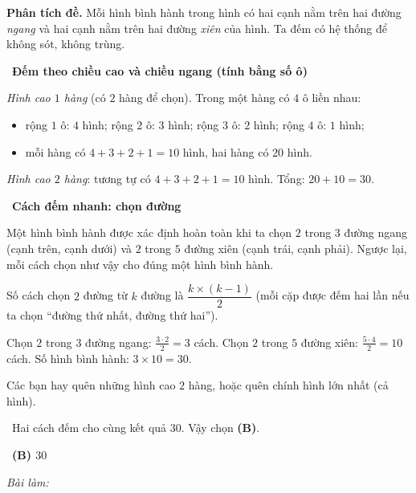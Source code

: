 \documentclass[11pt]{article}
\newif\ifsol \solfalse
\providecommand{\AnsWord}{Đáp số}
\newcommand{\StuProb}[2]{\begin{probboxS}{#1}{#2}\StuProbBody\end{probboxS}}
\newcommand{\ans}[1]{\par\smallskip{\bfseries\color{tmGreen!88!black}\AnsWord:}\ {\bfseries\color{AnsRed}#1}\par}
\newcommand{\probsol}[1]{%
  \begin{lrbox}{\solmeasure}\begin{minipage}{\dimexpr\linewidth-24pt\relax}#1\end{minipage}\end{lrbox}%
  \ifsol
    \begin{solbox}#1\end{solbox}%
  \else
    \setlength{\solht}{\dimexpr\ht\solmeasure+\dp\solmeasure+0.85cm\relax}%
    \ifdim\solht<1.35cm\setlength{\solht}{1.35cm}\fi
    \ifdim\solht>\StudentMaxWork\setlength{\solht}{\StudentMaxWork}\fi
    \par\noindent\begin{minipage}{\linewidth}%
    \expandafter\StuProb\StuProbArgs
    \begin{tcolorbox}[colback=white,colframe=Line,boxrule=0.8pt,arc=5pt,
      left=8pt,right=8pt,top=4pt,bottom=4pt,height=\solht]{\footnotesize\color{Slate}\itshape\WorkWord}\end{tcolorbox}%
    \end{minipage}\par\medskip
  \fi}
\newlength{\StudentMaxWork}\setlength{\StudentMaxWork}{4.5cm}
\newcommand{\step}[2]{\par\smallskip\noindent{\bfseries\color{tmBlue!85!black}\StepWord~#1.}\ {\bfseries #2}\par\nopagebreak}
\newcommand{\verify}[1]{\par\smallskip\noindent{\bfseries\color{tmGreen!80!black}\faCheckCircle\ \CheckWord}\ #1\par}
\def\WorkWord{Bài làm:}
\def\AnsWord{Đáp số}
\def\StepWord{Bước}
\def\CheckWord{Thử lại:}
\begin{document}
\probsol{
\textbf{Phân tích đề.} Mỗi hình bình hành trong hình có hai cạnh nằm trên hai đường \emph{ngang} và hai cạnh
nằm trên hai đường \emph{xiên} của hình. Ta đếm có hệ thống để không sót, không trùng.

\step{1}{Đếm theo chiều cao và chiều ngang (tính bằng số ô)}
\emph{Hình cao $1$ hàng} (có $2$ hàng để chọn). Trong một hàng có $4$ ô liền nhau:
\begin{itemize}[leftmargin=1.4em,itemsep=1pt]
\item rộng $1$ ô: $4$ hình; rộng $2$ ô: $3$ hình; rộng $3$ ô: $2$ hình; rộng $4$ ô: $1$ hình;
\item mỗi hàng có $4+3+2+1=10$ hình, hai hàng có $20$ hình.
\end{itemize}
\emph{Hình cao $2$ hàng}: tương tự có $4+3+2+1=10$ hình. Tổng: $20+10=30$.

\step{2}{Cách đếm nhanh: chọn đường}
\begin{proofbox}Một hình bình hành được xác định hoàn toàn khi ta chọn $2$ trong $3$ đường ngang (cạnh trên,
cạnh dưới) và $2$ trong $5$ đường xiên (cạnh trái, cạnh phải). Ngược lại, mỗi cách chọn như vậy cho đúng một
hình bình hành.\end{proofbox}
\begin{recallbox}Số cách chọn $2$ đường từ $k$ đường là $\dfrac{k\times(k-1)}{2}$ (mỗi cặp được đếm hai lần
nếu ta chọn ``đường thứ nhất, đường thứ hai'').\end{recallbox}
Chọn $2$ trong $3$ đường ngang: $\tfrac{3\cdot 2}{2}=3$ cách. Chọn $2$ trong $5$ đường xiên:
$\tfrac{5\cdot4}{2}=10$ cách. Số hình bình hành: $3\times 10=30$.

\begin{warnbox}Các bạn hay quên những hình cao $2$ hàng, hoặc quên chính hình lớn nhất (cả hình).\end{warnbox}
\verify{Hai cách đếm cho cùng kết quả $30$. Vậy chọn \textbf{(B)}.}
\ans{(B) $30$}
}
\end{document}

